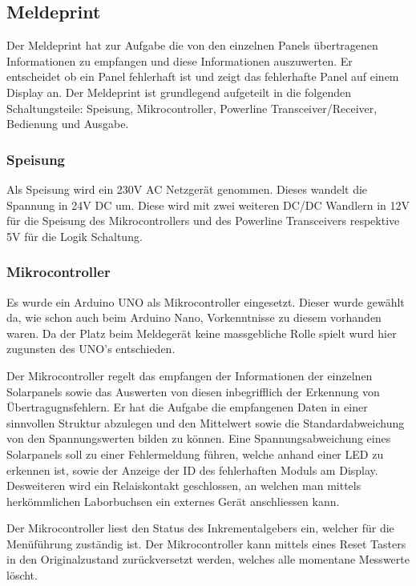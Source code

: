 \subsection{Meldeprint}
Der Meldeprint hat zur Aufgabe die von den einzelnen Panels übertragenen Informationen zu empfangen und diese Informationen auszuwerten. Er entscheidet ob ein Panel fehlerhaft ist und zeigt das fehlerhafte Panel auf einem Display an. Der Meldeprint ist grundlegend aufgeteilt in die folgenden Schaltungsteile: Speisung, Mikrocontroller, Powerline Transceiver/Receiver, Bedienung und Ausgabe.

\subsubsection{Speisung}
Als Speisung wird ein 230V AC Netzgerät genommen. Dieses wandelt die Spannung in 24V DC um. Diese wird mit zwei weiteren DC/DC Wandlern in 12V für die Speisung des Mikrocontrollers und des Powerline Transceivers respektive 5V für die Logik Schaltung.

\subsubsection{Mikrocontroller}
Es wurde ein Arduino UNO als Mikrocontroller eingesetzt. Dieser wurde gewählt da, wie schon auch beim Arduino Nano, Vorkenntnisse zu diesem vorhanden waren. Da der Platz beim Meldegerät keine massgebliche Rolle spielt wurd hier zugunsten des UNO's entschieden.

Der Mikrocontroller regelt das empfangen der Informationen der einzelnen Solarpanels sowie das Auswerten von diesen inbegrifflich der Erkennung von Übertragugnsfehlern. Er hat die Aufgabe die empfangenen Daten in einer sinnvollen Struktur abzulegen und den Mittelwert sowie die Standardabweichung von den Spannungswerten bilden zu können. Eine Spannungsabweichung eines Solarpanels soll zu einer Fehlermeldung führen, welche anhand einer LED zu erkennen ist, sowie der Anzeige der ID des fehlerhaften Moduls am Display. Desweiteren wird ein Relaiskontakt geschlossen, an welchen man mittels herkömmlichen Laborbuchsen ein externes Gerät anschliessen kann.

Der Mikrocontroller liest den Status des Inkrementalgebers ein, welcher für die Menüführung zuständig ist. Der Mikrocontroller kann mittels eines Reset Tasters in den Originalzustand zurückversetzt werden, welches alle momentane Messwerte löscht.

